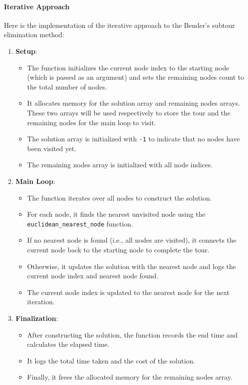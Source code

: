 \documentclass{article}
\begin{document}
\paragraph{Iterative Approach}
Here is the implementation of the iterative approach to the Bender's subtour elimination method:
\begin{enumerate} 
	\item \textbf{Setup}:
	      \begin{itemize}
		      \item The function initializes the current node index to the starting node (which is passed as an argument) 
			  and sets the remaining nodes count to the total number of nodes.
		      \item It allocates memory for the solution array and remaining nodes arrays. These two arrays will be used respectively to store the tour and the remaining nodes for the main loop to visit.
		      \item The solution array is initialized with \texttt{-1} to indicate that no nodes have been visited yet.
		      \item The remaining nodes array is initialized with all node indices.
	      \end{itemize}

	\item \textbf{Main Loop}:
	      \begin{itemize}
		      \item The function iterates over all nodes to construct the solution.
		      \item For each node, it finds the nearest unvisited node using the \texttt{euclidean\_nearest\_node} function.
		      \item If no nearest node is found (i.e., all nodes are visited), it connects the current node back to the starting node to complete the tour.
		      \item Otherwise, it updates the solution with the nearest node and logs the current node index and nearest node found.
		      \item The current node index is updated to the nearest node for the next iteration.
	      \end{itemize}

	\item \textbf{Finalization}:
	      \begin{itemize}
		      \item After constructing the solution, the function records the end time and calculates the elapsed time.
		      \item It logs the total time taken and the cost of the solution.
		      \item Finally, it frees the allocated memory for the remaining nodes array.
	      \end{itemize}
\end{enumerate}
\end{document}
